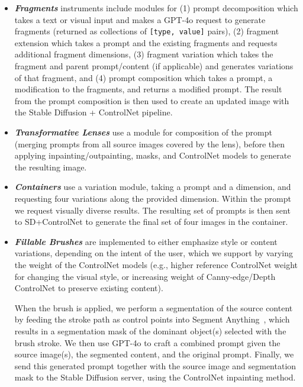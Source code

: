 \begin{itemize}
    
\item \textit{\textbf{Fragments}} instruments include modules for (1) prompt decomposition which takes a text or visual input and makes a GPT-4o request to generate fragments (returned as collections of \texttt{[type, value]} pairs), (2) fragment extension which takes a prompt and the existing fragments and requests additional fragment dimensions, (3) fragment variation which takes the fragment and parent prompt/content (if applicable) and generates variations of that fragment, and (4) prompt composition which takes a prompt, a modification to the fragments, and returns a modified prompt. The result from the prompt composition is then used to create an updated image with the Stable Diffusion + ControlNet pipeline. 


\item \textit{\textbf{Transformative Lenses}} use a module for composition of the prompt (merging prompts from all source images covered by the lens), before then applying inpainting/outpainting, masks, and ControlNet models to generate the resulting image. 


\item \textit{\textbf{Containers}} use a variation module, taking a prompt and a dimension, and requesting four variations along the provided dimension. Within the prompt we request visually diverse results. The resulting set of prompts is then sent to SD+ControlNet to generate the final set of four images in the container. 


\item \textbf{\textit{Fillable Brushes}} are implemented to either emphasize style or content variations, depending on the intent of the user, which we support by varying the weight of the ControlNet models (e.g., higher reference ControlNet weight for changing the visual style, or increasing weight of Canny-edge/Depth ControlNet to preserve existing content).

When the brush is applied, we perform a segmentation of the source content by feeding the stroke path as control points into Segment Anything~\cite{kirillov_segment_2023}, which results in a segmentation mask of the dominant object(s) selected with the brush stroke. We then use GPT-4o to craft a combined prompt given the source image(s), the segmented content, and the original prompt. Finally, we send this generated prompt together with the source image and segmentation mask to the Stable Diffusion server, using the ControlNet inpainting method.



\end{itemize}

